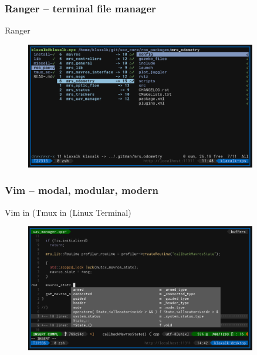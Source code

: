 \documentclass[aspectratio=1610]{beamer}
\begin{document}


\begin{frame}

  \frametitle{Ranger -- terminal file manager}

  \begin{block}{Ranger}
    \begin{figure}
      \includegraphics[width=0.9\textwidth]{./fig/ranger.png}
    \end{figure}
  \end{block}

\end{frame}



\begin{frame}
  \frametitle{Vim -- modal, modular, modern}

  \begin{block}{Vim in (Tmux in (Linux Terminal)}
    \begin{figure}
      \includegraphics[width=0.9\textwidth]{./fig/vim.png}
    \end{figure}
  \end{block}

\end{frame}
\end{document}
